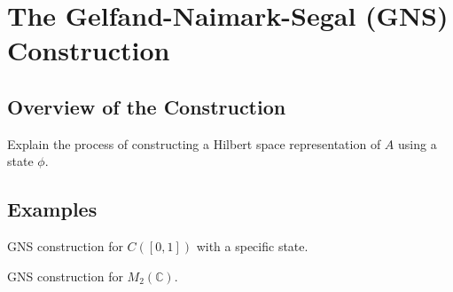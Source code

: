 \section{The Gelfand-Naimark-Segal (GNS) Construction}
\subsection{Overview of the Construction}
Explain the process of constructing a Hilbert space representation of \( A \) using a state \( \phi \).

\subsection{Examples}
\begin{example}
GNS construction for \( C([0,1]) \) with a specific state.
\end{example}
\begin{example}
GNS construction for \( M_2(\mathbb{C}) \).
\end{example}